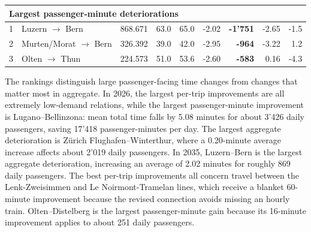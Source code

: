 \documentclass[preprint,12pt]{elsarticle}
\begin{document}
\begin{table}[htbp]
{\begin{tabular}{clrrrrrrr}
\midrule
\multicolumn{9}{l}{\textbf{Largest passenger-minute deteriorations}} \\
\midrule
1 & Luzern $\rightarrow$ Bern & 868.671 & 63.0 & 65.0 & -2.02 & \textbf{-1'751} & -2.65 & -1.5 \\
2 & Murten/Morat $\rightarrow$ Bern & 326.392 & 39.0 & 42.0 & -2.95 & \textbf{-964} & -3.22 & 1.2 \\
3 & Olten $\rightarrow$ Thun & 224.573 & 51.0 & 53.6 & -2.60 & \textbf{-583} & 0.16 & -4.3 \\
\bottomrule
\end{tabular}%
}
\end{table}
\newpage
The rankings distinguish large passenger-facing time changes from changes that matter most in aggregate. In 2026, the largest per-trip improvements are all extremely low-demand relations, while the largest passenger-minute improvement is Lugano--Bellinzona: mean total time falls by 5.08 minutes for about 3'426 daily passengers, saving 17'418 passenger-minutes per day. The largest aggregate deterioration is Zürich Flughafen--Winterthur, where a 0.20-minute average increase affects about 2'019 daily passengers. In 2035, Luzern--Bern is the largest aggregate deterioration, increasing an average of 2.02 minutes for roughly 869 daily passengers. The best per-trip improvements all concern travel between the Lenk-Zweisimmen and Le Noirmont-Tramelan lines, which receive a blanket 60-minute improvement because the revised connection avoids missing an hourly train. Olten--Distelberg is the largest passenger-minute gain because its 16-minute improvement applies to about 251 daily passengers.
\end{document}
